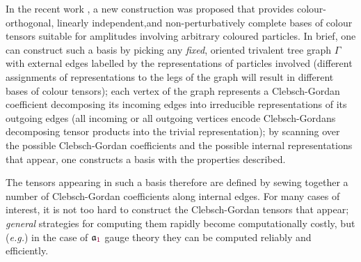 \documentclass[12pt,a4paper]{article}\let\ifpdf\relax
\begin{document}
In the recent work \cite{Bourjaily:2025hvq}, a new construction was proposed that provides colour-orthogonal, linearly independent,and non-perturbatively complete bases of colour tensors suitable for amplitudes involving arbitrary coloured particles. In brief, one can construct such a basis by picking any \emph{fixed}, oriented trivalent tree graph $\Gamma$ with external edges labelled by the representations of particles involved (different assignments of representations to the legs of the graph will result in different bases of colour tensors); each vertex of the graph represents a Clebsch-Gordan coefficient decomposing its incoming edges into irreducible representations of its outgoing edges (all incoming or all outgoing vertices encode Clebsch-Gordans decomposing tensor products into the trivial representation); by scanning over the possible Clebsch-Gordan coefficients and the possible internal representations that appear, one constructs a basis with the properties described. 

The tensors appearing in such a basis therefore are defined by sewing together a number of Clebsch-Gordan coefficients along internal edges. For many cases of interest, it is not too hard to construct the Clebsch-Gordan tensors that appear; \emph{general} strategies for computing them rapidly become computationally costly, but (\emph{e.g.}) in the case of $\mathfrak{a}_{\r{1}}$ gauge theory they can be computed reliably and efficiently. 
\end{document}

